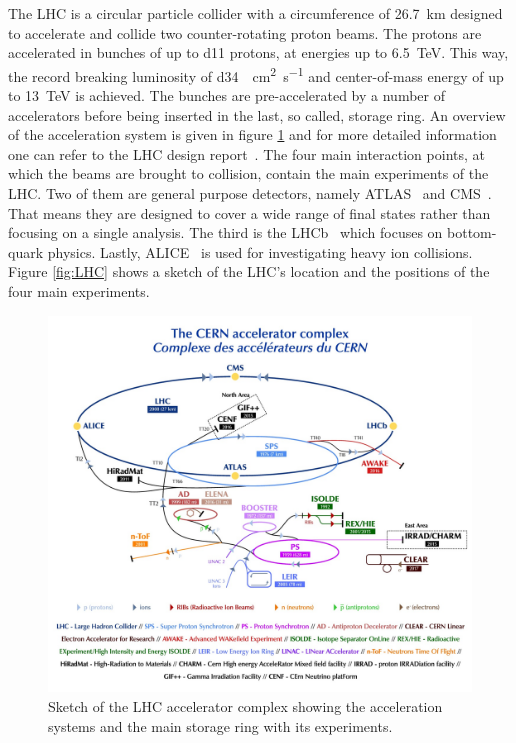 The LHC is a circular particle collider with a circumference of \SI{26.7}{\kilo \metre} designed to  accelerate and collide two counter-rotating proton beams. The protons are accelerated in bunches of up to \num{d11} protons, at energies up to \SI{6.5}{\tera \electronvolt}. This way, the record breaking luminosity of \SI{d34}{\per\square\cm \per\s} and center-of-mass energy of up to \SI{13}{\tera \electronvolt} is achieved. The bunches are pre-accelerated by a number of accelerators before being inserted in the last, so called, storage ring. An overview of the acceleration system is given in figure \ref{fig:accelerator_complex} and for more detailed information one can refer to the LHC design report~\cite{lhc_machine}. 
The four main interaction points, at which the beams are brought to collision, contain the main experiments of the LHC. Two of them are general purpose detectors, namely ATLAS~\cite{atlas} and CMS~\cite{cms}. That means they are designed to cover a wide range of final states rather than focusing on a single analysis. The third is the LHCb~\cite{lhcb} which focuses on bottom-quark physics. Lastly, ALICE~\cite{alice} is used for investigating heavy ion collisions. Figure \ref{fig:LHC} shows a sketch of the LHC's location and the positions of the four main experiments.

\begin{figure}[htbp]
\centering
\includegraphics[width=\figwidth]{figures_LHC/CCC-v2018-print-v2.jpg}
\caption[Sketch of the LHC accelerator complex]{Sketch of the LHC accelerator complex showing the acceleration systems and the main storage ring with its experiments.~\cite{Mobs:2636343}}
\label{fig:accelerator_complex}
\end{figure}

